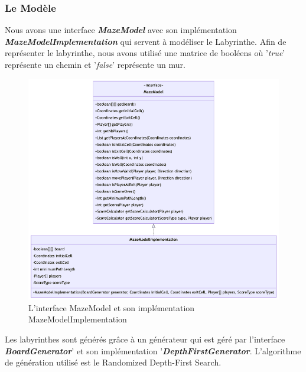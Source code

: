 \subsubsection{Le Modèle}
\label{subsubsec:modele}

Nous avons une interface \textbf{\textit{MazeModel}} avec son implémentation
\textbf{\textit{MazeModelImplementation}} qui servent à modéliser le
Labyrinthe. Afin de représenter le labyrinthe, nous avons utilisé une matrice
de booléens où '\textit{true}' représente un chemin et '\textit{false}'
représente un mur.

\begin{figure}[htb]
    \centering
    \includegraphics[width=15cm]{ressources/Implementation/Labyrinthe/Modele/MazeModelAndImplementation.png}
    \caption{L'interface MazeModel et son implémentation MazeModelImplementation}
    \label{fig:MazeModelAndImplementation}
\end{figure}

Les labyrinthes sont générés grâce à un générateur qui est géré par l'interface
\textbf{\textit{BoardGenerator}}' et son implémentation
'\textbf{\textit{DepthFirstGenerator}}. L'algorithme de génération utilisé est
le Randomized Depth-First Search.

